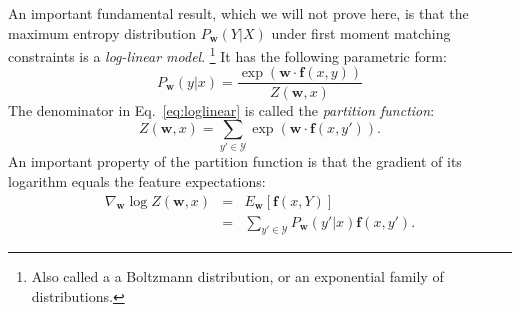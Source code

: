 An important fundamental result, which we will not prove here, is that the maximum entropy distribution $P_{\boldsymbol{w}}(Y|X)$ under first moment matching constraints  
is a \emph{log-linear model}.
\footnote{Also called a a Boltzmann distribution, or an exponential family of 
distributions.} %
It has the following parametric form: 
\begin{equation}\label{eq:loglinear}
P_{\boldsymbol{w}}(y|x) = \frac{\exp(\boldsymbol{w} \cdot \boldsymbol{f}(x,y))}{Z(\boldsymbol{w},x)}
\end{equation}
The denominator in Eq.~\ref{eq:loglinear} is called the \emph{partition function}:
\begin{equation}
Z(\boldsymbol{w},x) = \sum_{y' \in \mathcal{Y}} \exp(\boldsymbol{w} \cdot \boldsymbol{f}(x,y')).
\end{equation}
An important property of the partition function is that the gradient of its logarithm equals 
the feature expectations: 
\begin{eqnarray}
\nabla_{\boldsymbol{w}} \log Z(\boldsymbol{w},x) &=& E_{\boldsymbol{w}} [\boldsymbol{f}(x,Y)]\nonumber\\
&=& \sum_{y' \in \mathcal{Y}} P_{\boldsymbol{w}}(y'|x) \boldsymbol{f}(x,y').
\end{eqnarray}

